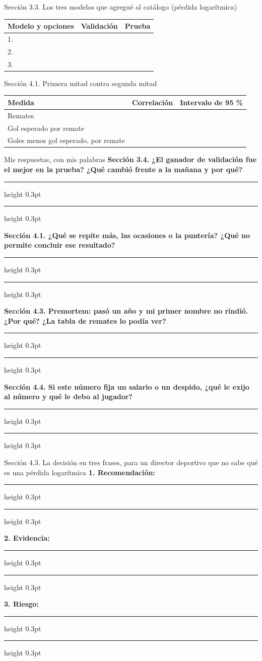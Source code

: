 \documentclass[10pt,letterpaper]{article}
\newcommand{\renglon}{\vspace{6mm}\hrule height 0.3pt\relax}
\begin{document}
\begin{caja}{Sección 3.3. Los tres modelos que agregué al catálogo (pérdida logarítmica)}
\begin{tabularx}{\linewidth}{|l|X|X|}\hline
\textbf{\small Modelo y opciones} & \textbf{\small Validación} & \textbf{\small Prueba}\\\hline
\rule{0pt}{7mm}1. &  & \\\hline
\rule{0pt}{7mm}2. &  & \\\hline
\rule{0pt}{7mm}3. &  & \\\hline
\end{tabularx}
\end{caja}
\begin{caja}{Sección 4.1. Primera mitad contra segunda mitad}
\begin{tabularx}{\linewidth}{|l|X|X|}\hline
\textbf{\small Medida} & \textbf{\small Correlación} & \textbf{\small Intervalo de 95 \%}\\\hline
\rule{0pt}{7mm}Remates &  & \\\hline
\rule{0pt}{7mm}Gol esperado por remate &  & \\\hline
\rule{0pt}{7mm}Goles menos gol esperado, por remate &  & \\\hline
\end{tabularx}
\end{caja}
\begin{caja}{Mis respuestas, con mis palabras}
{\small\bfseries Sección 3.4. ¿El ganador de validación fue el mejor en la prueba? ¿Qué cambió frente a la mañana y por qué?}\renglon\renglon\vspace{2mm}

{\small\bfseries Sección 4.1. ¿Qué se repite más, las ocasiones o la puntería? ¿Qué no permite concluir ese resultado?}\renglon\renglon\vspace{2mm}

{\small\bfseries Sección 4.3. Premortem: pasó un año y mi primer nombre no rindió. ¿Por qué? ¿La tabla de remates lo podía ver?}\renglon\renglon\vspace{2mm}

{\small\bfseries Sección 4.4. Si este número fija un salario o un despido, ¿qué le exijo al número y qué le debo al jugador?}\renglon\renglon\vspace{2mm}

\end{caja}
\begin{cajaroja}{Sección 4.3. La decisión en tres frases, para un director deportivo que no sabe qué es una pérdida logarítmica}
{\small\bfseries 1. Recomendación:}\renglon\renglon\vspace{2mm}

{\small\bfseries 2. Evidencia:}\renglon\renglon\vspace{2mm}

{\small\bfseries 3. Riesgo:}\renglon\renglon\vspace{2mm}

\end{cajaroja}
\end{document}
